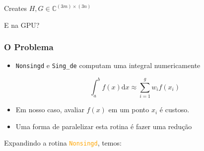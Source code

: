 \documentclass{beamer}
\newcommand{\Cfield}{\mathbb{C}}
\begin{document}

\begin{frame}
\begin{algorithm}[H]
\label{ghmatecd_openmp}
\caption{Creates $H, G \in \Cfield^{(3m)\times(3n)}$}
\begin{algorithmic}[1]
				\Else
				\EndIf
			\EndFor
	 \EndFor
	\EndProcedure
\end{algorithmic}
\end{algorithm}
E na GPU?
\end{frame}


\begin{frame}
\frametitle{O Problema}
\begin{itemize}
\item \texttt{Nonsingd} e \texttt{Sing\_de} computam uma integral numericamente

\begin{equation}
	\int_{a}^{b} f(x)\text{d}x \approx \sum_{i = 1}^{g}w_i f(x_i) \label{quadrature} \nonumber
\end{equation}

\item Em nosso caso, avaliar $f(x)$ em um ponto $x_i$ é custoso.
\item Uma forma de paralelizar esta rotina é fazer uma redução

\end{itemize}
\end{frame}


Expandindo a rotina \textcolor{orange}{\texttt{Nonsingd}}, temos:
\end{document}
